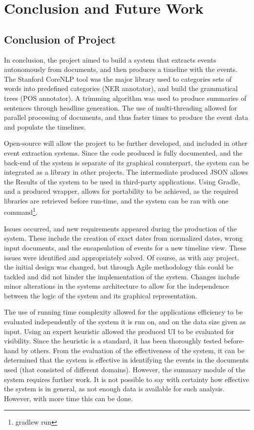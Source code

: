 \chapter{Conclusion and Future Work}

\section{Conclusion of Project}
\par In conclusion, the project aimed to build a system that extracts events autonomously from documents, and then produces a timeline with the events. The Stanford CoreNLP tool was the major library used to categories sets of words into predefined categories (NER annotator), and build the grammatical trees (POS annotator). A trimming algorithm was used to produce summaries of sentences through headline generation. The use of multi-threading allowed for parallel processing of documents, and thus faster times to produce the event data and populate the timelines. 

\par Open-source will allow the project to be further developed, and included in other event extraction systems.  Since the code produced is fully documented, and the back-end of the system is separate of its graphical counterpart, the system can be integrated as a library in other projects. The intermediate produced JSON allows the Results of the system to be used in third-party applications. Using Gradle, and a produced wrapper, allows for portability to be achieved, as the required libraries are retrieved before run-time, and the system can be ran with one command\footnote{gradlew run}. 

\par Issues occurred, and new requirements appeared during the production of the system. These include the creation of exact dates from normalized dates, wrong input documents, and the encapsulation of events for a new timeline view. These issues were identified and appropriately solved. Of course, as with any project, the initial design was changed, but through Agile methodology this could be tackled and did not hinder the implementation of the system. Changes include minor alterations in the systems architecture to allow for the independence between the logic of the system and its graphical representation.

\par The use of running time complexity allowed for the applications efficiency to be evaluated independently of the system it is run on, and on the data size given as input. Using an expert heuristic allowed the produced UI to be evaluated for visibility. Since the heuristic is a standard, it has been thoroughly tested before-hand by others. From the evaluation of the effectiveness of the system, it can be determined that the system is effective in identifying the events in the documents used (that consisted of different domains). However, the summary module of the system requires further work. It is not possible to say with certainty how effective the system is in general, as not enough data is available for such analysis. However, with more time this can be done.

